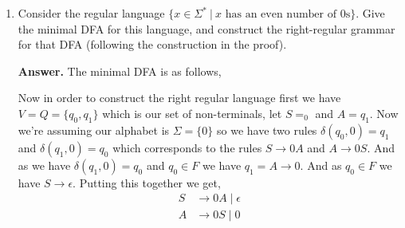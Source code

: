 \documentclass[11pt]{article}
\begin{document}
\begin{enumerate}
      and we have $q_n \in F$ by definition  so we get $\delta(q_0, x) \in F$

      \vspace{1em}
      
      Now looking at the reverse we have $\delta(q_{0}, x) \in F$ and we need to show that $S \stackrel{*}{\implies} x$. Now if $\delta(q_{0}, x) \in F$ then we have a sequence of state $q_{0}, \dots, q_n$ such that $q_n \in F$ and $\delta(q_{i - 1}, a_i) = q_i$. Now clearly as $q_{0}$ corresponds at $S$ and we as each state $q_i$ other than the accept and start state will correspond to some arbitrary non-terminal state say $B_i$ we have if $q_i \in \delta(q_{i -1 }, a_i)$ this implies that $B_{i - 1} \to a_i B_{q_i}$ so putting it all together if we have $\delta(q_0, x) = q_n \in F$ then this means we have, 
      \[
        \delta(q_{0}, x) = \delta(\dots \delta(\delta(q_{0}, a_{1}), a_{2}), a_n)\in F
      \]

      which means that we get, 
      \[
        S \implies a_{1}A_{1} \implies a_{1}a_{2} \dots a_{n - 1}A_{n - 1} \implies x
      \]

      or $S \stackrel{*}{\implies} x$




    \item Consider the regular language $\{x \in \Sigma^* ~|~ x \text{ has an even number of 0s}\}$. Give the minimal DFA for this language, and construct the right-regular grammar for that DFA (following the construction in the proof). 

      \textbf{Answer.} The minimal DFA is as follows,
      \begin{center}
      \end{center}

      Now in order to construct the right regular language first we have $V = Q = \{q_{0}, q_{1}\}$ which  is our set of non-terminals, let $S =_{0}$ and $A = q_{1}$. Now we're assuming our alphabet is $\Sigma = \{0\}$ so we have two rules $\delta(q_{0}, 0) = q_{1}$ and $\delta(q_{1}, 0) = q_{0}$ which corresponds to the rules $S \to 0A$ and $A \to 0S$. And as we have $\delta(q_{1}, 0) = q_{0}$ and $q_{0} \in F$ we have $q_{1} = A \to 0$. And as $q_{0} \in F$ we have $S \to \epsilon$. Putting this together we get, 
      \begin{align*}
        S &\to 0A \mid \epsilon\\
        A &\to 0S \mid 0\\
      \end{align*}



\end{enumerate}
\end{document}
